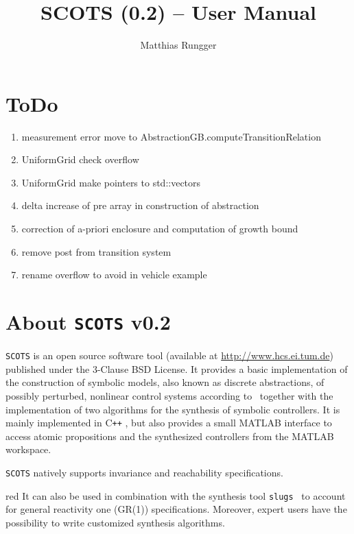 \documentclass[a4paper]{amsart}
\title{SCOTS (0.2) -- User Manual}
\author{Matthias Rungger}
\newcommand\Cpp{C\texttt{++} }
\begin{document}
  \maketitle

	\tableofcontents
	\newpage
	

\section{ToDo}

\begin{enumerate}
  \item measurement error move to AbstractionGB.computeTransitionRelation 
  \item UniformGrid check overflow
  \item UniformGrid make pointers to std::vectors
  \item delta increase of pre array in construction of abstraction
  \item correction of a-priori enclosure and computation of growth bound
	\item remove post from transition system
	\item rename overflow to avoid in vehicle example
\end{enumerate}

\newpage


\section{About {\tt SCOTS} v0.2}

{\tt SCOTS} is an open source software tool (available at
\mbox{\url{http://www.hcs.ei.tum.de}}) published under the 3-Clause BSD License. It
provides a basic implementation of the construction of symbolic models, also
known as discrete abstractions, of possibly perturbed, nonlinear control systems
according to~\cite{ReissigWeberRungger15} together with the implementation of
two algorithms for the synthesis of symbolic controllers. It is mainly implemented
in \Cpp, but also provides a small MATLAB interface to access atomic propositions
and the synthesized controllers from the MATLAB workspace.

{\tt SCOTS} natively supports invariance and reachability
specifications. 
\begin{color}{red}
It can also be used in
combination with the synthesis tool {\tt slugs}~\cite{EhlersRaman16} to account for
general reactivity one (GR(1)) specifications. Moreover, expert users have the
possibility to write customized synthesis algorithms.
\end{color}
\end{document}
